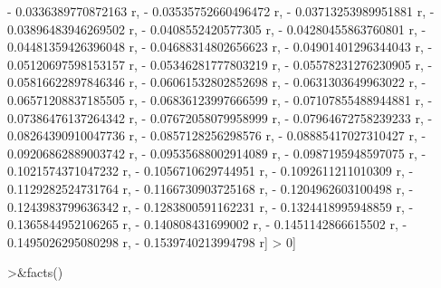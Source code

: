 \documentclass[a4paper,10pt]{article}
\begin{document}
\begin{eulernotebook}
\begin{eulercomment}
\begin{eulercomment}
\begin{eulercomment}
\begin{eulercomment}
\begin{eulercomment}
\begin{eulercomment}
\begin{eulercomment}
\begin{eulercomment}
\begin{eulercomment}
\begin{eulercomment}
\begin{eulercomment}
\begin{eulercomment}
\begin{eulercomment}
\begin{eulercomment}
\begin{eulercomment}
\begin{eulercomment}
\begin{eulercomment}
\begin{eulercomment}
\begin{eulercomment}
\begin{eulercomment}
\begin{eulercomment}
\begin{eulercomment}
\begin{eulercomment}
\begin{eulercomment}
\begin{eulercomment}
\begin{eulercomment}
\begin{eulercomment}
\begin{eulercomment}
\begin{euleroutput}
  - 0.0336389770872163 r, - 0.03535752660496472 r, 
  - 0.03713253989951881 r, - 0.03896483946269502 r, 
  - 0.0408552420577305 r, - 0.04280455863760801 r, 
  - 0.04481359426396048 r, - 0.04688314802656623 r, 
  - 0.04901401296344043 r, - 0.05120697598153157 r, 
  - 0.05346281777803219 r, - 0.05578231276230905 r, 
  - 0.05816622897846346 r, - 0.06061532802852698 r, 
  - 0.0631303649963022 r, - 0.06571208837185505 r, 
  - 0.06836123997666599 r, - 0.07107855488944881 r, 
  - 0.07386476137264342 r, - 0.07672058079958999 r, 
  - 0.07964672758239233 r, - 0.08264390910047736 r, 
  - 0.0857128256298576 r, - 0.08885417027310427 r, 
  - 0.09206862889003742 r, - 0.09535688002914089 r, 
  - 0.0987195948597075 r, - 0.1021574371047232 r, 
  - 0.1056710629744951 r, - 0.1092611211010309 r, 
  - 0.1129282524731764 r, - 0.1166730903725168 r, 
  - 0.1204962603100498 r, - 0.1243983799636342 r, 
  - 0.1283800591162231 r, - 0.1324418995948859 r, 
  - 0.1365844952106265 r, - 0.140808431699002 r, 
  - 0.1451142866615502 r, - 0.1495026295080298 r, 
  - 0.1539740213994798 r] > 0]
  
\end{euleroutput}
\begin{eulerprompt}
>&facts()
\end{eulerprompt}
\begin{euleroutput}
  

\end{euleroutput}
\end{eulercomment}
\end{eulercomment}
\end{eulercomment}
\end{eulercomment}
\end{eulercomment}
\end{eulercomment}
\end{eulercomment}
\end{eulercomment}
\end{eulercomment}
\end{eulercomment}
\end{eulercomment}
\end{eulercomment}
\end{eulercomment}
\end{eulercomment}
\end{eulercomment}
\end{eulercomment}
\end{eulercomment}
\end{eulercomment}
\end{eulercomment}
\end{eulercomment}
\end{eulercomment}
\end{eulercomment}
\end{eulercomment}
\end{eulercomment}
\end{eulercomment}
\end{eulercomment}
\end{eulercomment}
\end{eulercomment}
\end{eulernotebook}
\end{document}
